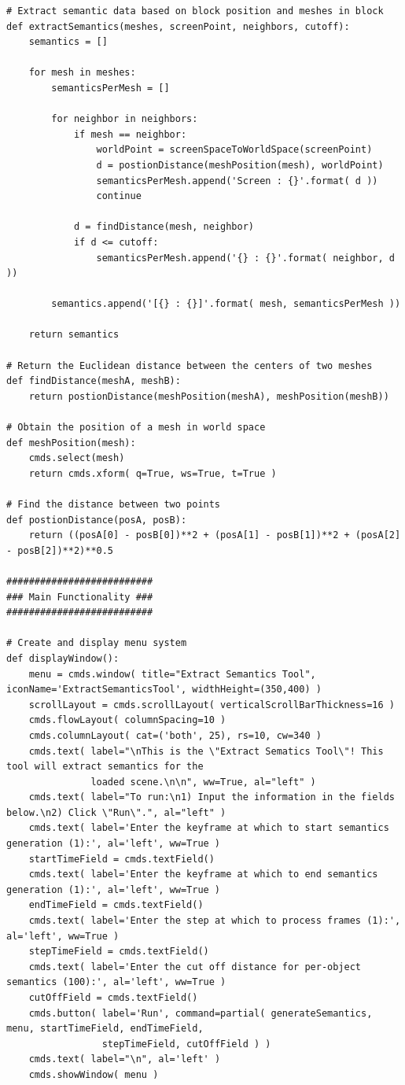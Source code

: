 \documentclass[conference]{IEEEtran}
\begin{document}
{\begin{verbatim}
# Extract semantic data based on block position and meshes in block
def extractSemantics(meshes, screenPoint, neighbors, cutoff):
    semantics = []
    
    for mesh in meshes:
        semanticsPerMesh = []
        
        for neighbor in neighbors:
            if mesh == neighbor:
                worldPoint = screenSpaceToWorldSpace(screenPoint)
                d = postionDistance(meshPosition(mesh), worldPoint)
                semanticsPerMesh.append('Screen : {}'.format( d ))
                continue
                
            d = findDistance(mesh, neighbor)
            if d <= cutoff:
                semanticsPerMesh.append('{} : {}'.format( neighbor, d ))
        
        semantics.append('[{} : {}]'.format( mesh, semanticsPerMesh ))
                
    return semantics

# Return the Euclidean distance between the centers of two meshes
def findDistance(meshA, meshB):
    return postionDistance(meshPosition(meshA), meshPosition(meshB))

# Obtain the position of a mesh in world space
def meshPosition(mesh):
    cmds.select(mesh)
    return cmds.xform( q=True, ws=True, t=True )

# Find the distance between two points
def postionDistance(posA, posB):
    return ((posA[0] - posB[0])**2 + (posA[1] - posB[1])**2 + (posA[2] - posB[2])**2)**0.5

##########################
### Main Functionality ###
##########################

# Create and display menu system
def displayWindow():
    menu = cmds.window( title="Extract Semantics Tool", iconName='ExtractSemanticsTool', widthHeight=(350,400) )
    scrollLayout = cmds.scrollLayout( verticalScrollBarThickness=16 )
    cmds.flowLayout( columnSpacing=10 )
    cmds.columnLayout( cat=('both', 25), rs=10, cw=340 )
    cmds.text( label="\nThis is the \"Extract Sematics Tool\"! This tool will extract semantics for the
               loaded scene.\n\n", ww=True, al="left" )
    cmds.text( label="To run:\n1) Input the information in the fields below.\n2) Click \"Run\".", al="left" )
    cmds.text( label='Enter the keyframe at which to start semantics generation (1):', al='left', ww=True )
    startTimeField = cmds.textField()
    cmds.text( label='Enter the keyframe at which to end semantics generation (1):', al='left', ww=True )
    endTimeField = cmds.textField()
    cmds.text( label='Enter the step at which to process frames (1):', al='left', ww=True )
    stepTimeField = cmds.textField()
    cmds.text( label='Enter the cut off distance for per-object semantics (100):', al='left', ww=True )
    cutOffField = cmds.textField()
    cmds.button( label='Run', command=partial( generateSemantics, menu, startTimeField, endTimeField,
                 stepTimeField, cutOffField ) )
    cmds.text( label="\n", al='left' )
    cmds.showWindow( menu )


\end{verbatim}}
\end{document}
